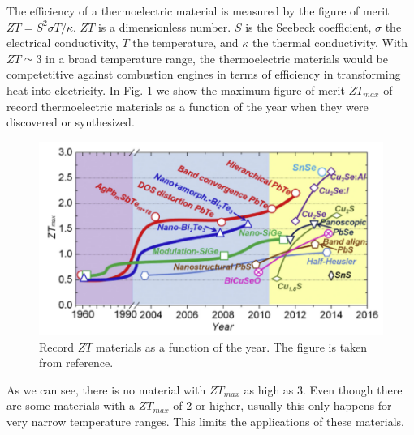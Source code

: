 The efficiency of a thermoelectric material is measured by the figure of merit $ZT=S^{2}\sigma T/\kappa$. $ZT$ is 
a dimensionless number. $S$ is the Seebeck coefficient, $\sigma$ the electrical conductivity, $T$ the temperature, 
and $\kappa$ the thermal conductivity. With $ZT\simeq3$ in a broad temperature range, the thermoelectric materials 
would be competetitive against combustion engines in terms of efficiency in transforming heat into 
electricity\cite{zhang2015thermoelectric}. In Fig. \ref{ztvst} we show the maximum figure of merit $ZT_{max}$ of 
record thermoelectric materials as a function of the year when they were discovered or synthesized.
\begin{figure}[h]
\begin{center}
\includegraphics[width=0.9\linewidth]{Figures/ztvstemp.png}
\caption[Record $ZT$ materials]{Record $ZT$ materials as a function of the year. The figure is taken from 
reference\cite{zhang2015thermoelectric}.}
\label{ztvst}
\end{center}
\end{figure}
As we can see, there is no material with $ZT_{max}$ as high as 3. Even though there are some materials with a 
$ZT_{max}$ of 2 or higher, usually this only happens for very narrow temperature ranges\cite{zhao2014ultralow}. This 
limits the applications of these materials. \\

